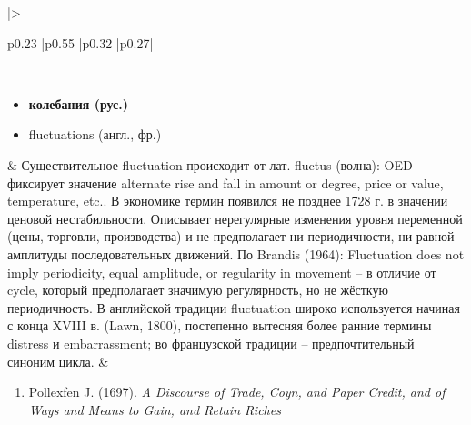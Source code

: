 \begin{longtable}{
    |>{\raggedright\arraybackslash}p{0.23\textwidth}
    |p{0.55\textwidth}
    |p{0.32\textwidth}
    |p{0.27\textwidth}|
    } %
\caption{Термины колебаний}
\label{tab:fluctuation-terms} \\


\begin{minipage}[t]{\linewidth}
    \raggedright
    \begin{itemize}
        \item \textbf{колебания (рус.)}
        \item fluctuations (англ., фр.)
    \end{itemize}
\end{minipage}
&
Существительное fluctuation происходит от лат. \textquotedbl{}fluctus\textquotedbl{} (волна): OED фиксирует значение \textquotedbl{}alternate rise and fall in amount or degree, price or value, temperature, etc.\textquotedbl{}. В экономике термин появился не позднее 1728 г. в значении ценовой нестабильности. Описывает нерегулярные изменения уровня переменной (цены, торговли, производства) и не предполагает ни периодичности, ни равной амплитуды последовательных движений. По Brandis (1964): \textquotedbl{}Fluctuation does not imply periodicity, equal amplitude, or regularity in movement\textquotedbl{} – в отличие от \textquotedbl{}cycle\textquotedbl{}, который предполагает значимую регулярность, но не жёсткую периодичность. В английской традиции \textquotedbl{}fluctuation\textquotedbl{} широко используется начиная с конца XVIII в. (Lawn, 1800), постепенно вытесняя более ранние термины \textquotedbl{}distress\textquotedbl{} и \textquotedbl{}embarrassment\textquotedbl{}; во французской традиции – предпочтительный синоним \textquotedbl{}цикла\textquotedbl{}.
&
\begin{minipage}[t]{\linewidth}
    \vspace{-7pt}
    \RaggedRight
    \begin{enumerate}
        \item Pollexfen J. (1697). \textit{A Discourse of Trade, Coyn, and Paper Credit, and of Ways and Means to Gain, and Retain Riches}\cite{Pollexfen-1697}

\end{enumerate}
\end{minipage}
\end{longtable}
